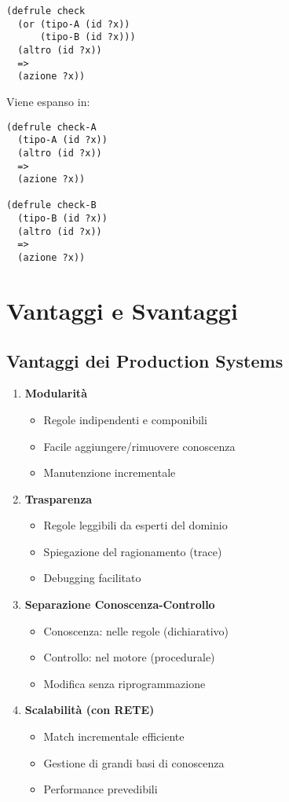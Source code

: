 \begin{esempio}[Espansione OR]
\begin{lstlisting}[language=CLIPS]
(defrule check
  (or (tipo-A (id ?x))
      (tipo-B (id ?x)))
  (altro (id ?x))
  =>
  (azione ?x))
\end{lstlisting}

Viene espanso in:
\begin{lstlisting}[language=CLIPS]
(defrule check-A
  (tipo-A (id ?x))
  (altro (id ?x))
  =>
  (azione ?x))

(defrule check-B
  (tipo-B (id ?x))
  (altro (id ?x))
  =>
  (azione ?x))
\end{lstlisting}
\end{esempio}

\section{Vantaggi e Svantaggi}

\subsection{Vantaggi dei Production Systems}

\begin{enumerate}
\item \textbf{Modularità}
\begin{itemize}
\item Regole indipendenti e componibili
\item Facile aggiungere/rimuovere conoscenza
\item Manutenzione incrementale
\end{itemize}

\item \textbf{Trasparenza}
\begin{itemize}
\item Regole leggibili da esperti del dominio
\item Spiegazione del ragionamento (trace)
\item Debugging facilitato
\end{itemize}

\item \textbf{Separazione Conoscenza-Controllo}
\begin{itemize}
\item Conoscenza: nelle regole (dichiarativo)
\item Controllo: nel motore (procedurale)
\item Modifica senza riprogrammazione
\end{itemize}

\item \textbf{Scalabilità (con RETE)}
\begin{itemize}
\item Match incrementale efficiente
\item Gestione di grandi basi di conoscenza
\item Performance prevedibili
\end{itemize}
\end{enumerate}

